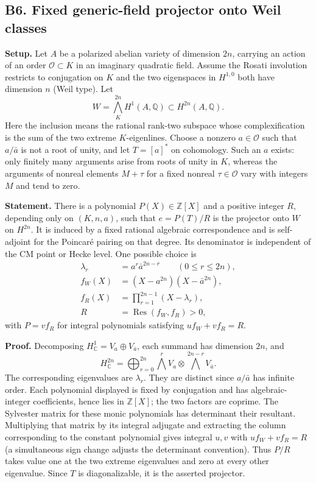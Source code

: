 \documentclass[11pt,a4paper]{article}
\theoremstyle{definition}
\begin{document}
\subsection{B6. Fixed generic-field projector onto Weil classes}\label{b6.-fixed-generic-field-projector-onto-weil-classes}

\textbf{Setup.} Let \(A\) be a polarized abelian variety of dimension \(2n\), carrying an action of an order \(\mathcal O\subset K\) in an imaginary quadratic field. Assume the Rosati involution restricts to conjugation on \(K\) and the two eigenspaces in \(H^{1,0}\) both have dimension \(n\) (Weil type). Let \[
 W=\bigwedge_K^{2n}H^1(A,\mathbb Q)\subset H^{2n}(A,\mathbb Q).
\] Here the inclusion means the rational rank-two subspace whose complexification is the sum of the two extreme \(K\)-eigenlines. Choose a nonzero \(a\in\mathcal O\) such that \(a/\bar a\) is not a root of unity, and let \(T=[a]^*\) on cohomology. Such an \(a\) exists: only finitely many arguments arise from roots of unity in \(K\), whereas the arguments of nonreal elements \(M+\tau\) for a fixed nonreal \(\tau\in\mathcal O\) vary with integers \(M\) and tend to zero.

\textbf{Statement.} There is a polynomial \(P(X)\in\mathbb Z[X]\) and a positive integer \(R\), depending only on \((K,n,a)\), such that \(e=P(T)/R\) is the projector onto \(W\) on \(H^{2n}\). It is induced by a fixed rational algebraic correspondence and is self-adjoint for the Poincaré pairing on that degree. Its denominator is independent of the CM point or Hecke level. One possible choice is \[
 \begin{aligned}
 \lambda_r&=a^r\bar a^{2n-r}\qquad(0\leq r\leq2n),\\
 f_W(X)&=(X-a^{2n})(X-\bar a^{2n}),\\
 f_R(X)&=\prod_{r=1}^{2n-1}(X-\lambda_r),\\
 R&=\operatorname{Res}(f_W,f_R)>0,
 \end{aligned}
\] with \(P=vf_R\) for integral polynomials satisfying \(u f_W+v f_R=R\).

\textbf{Proof.} Decomposing \(H^1_\mathbb C=V_a\oplus V_{\bar a}\), each summand has dimension \(2n\), and \[
 H^{2n}_\mathbb C=\bigoplus_{r=0}^{2n}\bigwedge^rV_a\otimes\bigwedge^{2n-r}V_{\bar a}.
\] The corresponding eigenvalues are \(\lambda_r\). They are distinct since \(a/\bar a\) has infinite order. Each polynomial displayed is fixed by conjugation and has algebraic-integer coefficients, hence lies in \(\mathbb Z[X]\); the two factors are coprime. The Sylvester matrix for these monic polynomials has determinant their resultant. Multiplying that matrix by its integral adjugate and extracting the column corresponding to the constant polynomial gives integral \(u,v\) with \(u f_W+v f_R=R\) (a simultaneous sign change adjusts the determinant convention). Thus \(P/R\) takes value one at the two extreme eigenvalues and zero at every other eigenvalue. Since \(T\) is diagonalizable, it is the asserted projector.
\end{document}

